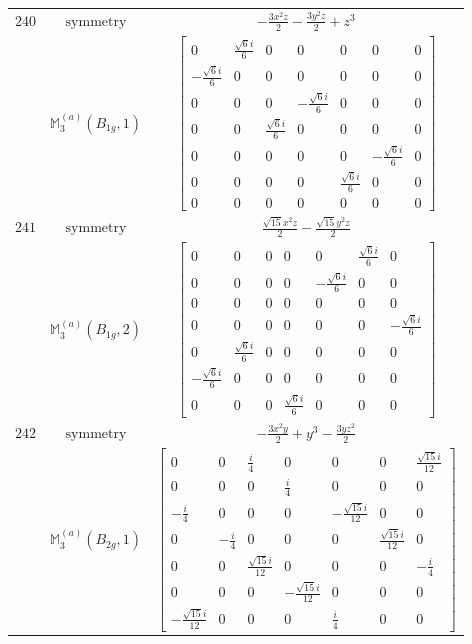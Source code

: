 \documentclass[fleqn,8pt,landscape]{jsarticle}
\begin{document}
\begin{longtable}{ccc}
$ 240 $ & $ \text{symmetry} $ & $ - \frac{3 x^{2} z}{2} - \frac{3 y^{2} z}{2} + z^{3} $ \\
$  $ & $ \mathbb{M}_{3}^{(a)}(B_{1g},1) $ & $ \begin{bmatrix} 0 & \frac{\sqrt{6} i}{6} & 0 & 0 & 0 & 0 & 0 \\ - \frac{\sqrt{6} i}{6} & 0 & 0 & 0 & 0 & 0 & 0 \\ 0 & 0 & 0 & - \frac{\sqrt{6} i}{6} & 0 & 0 & 0 \\ 0 & 0 & \frac{\sqrt{6} i}{6} & 0 & 0 & 0 & 0 \\ 0 & 0 & 0 & 0 & 0 & - \frac{\sqrt{6} i}{6} & 0 \\ 0 & 0 & 0 & 0 & \frac{\sqrt{6} i}{6} & 0 & 0 \\ 0 & 0 & 0 & 0 & 0 & 0 & 0 \end{bmatrix} $ \\ \hline
$ 241 $ & $ \text{symmetry} $ & $ \frac{\sqrt{15} x^{2} z}{2} - \frac{\sqrt{15} y^{2} z}{2} $ \\
$  $ & $ \mathbb{M}_{3}^{(a)}(B_{1g},2) $ & $ \begin{bmatrix} 0 & 0 & 0 & 0 & 0 & \frac{\sqrt{6} i}{6} & 0 \\ 0 & 0 & 0 & 0 & - \frac{\sqrt{6} i}{6} & 0 & 0 \\ 0 & 0 & 0 & 0 & 0 & 0 & 0 \\ 0 & 0 & 0 & 0 & 0 & 0 & - \frac{\sqrt{6} i}{6} \\ 0 & \frac{\sqrt{6} i}{6} & 0 & 0 & 0 & 0 & 0 \\ - \frac{\sqrt{6} i}{6} & 0 & 0 & 0 & 0 & 0 & 0 \\ 0 & 0 & 0 & \frac{\sqrt{6} i}{6} & 0 & 0 & 0 \end{bmatrix} $ \\ \hline
$ 242 $ & $ \text{symmetry} $ & $ - \frac{3 x^{2} y}{2} + y^{3} - \frac{3 y z^{2}}{2} $ \\
$  $ & $ \mathbb{M}_{3}^{(a)}(B_{2g},1) $ & $ \begin{bmatrix} 0 & 0 & \frac{i}{4} & 0 & 0 & 0 & \frac{\sqrt{15} i}{12} \\ 0 & 0 & 0 & \frac{i}{4} & 0 & 0 & 0 \\ - \frac{i}{4} & 0 & 0 & 0 & - \frac{\sqrt{15} i}{12} & 0 & 0 \\ 0 & - \frac{i}{4} & 0 & 0 & 0 & \frac{\sqrt{15} i}{12} & 0 \\ 0 & 0 & \frac{\sqrt{15} i}{12} & 0 & 0 & 0 & - \frac{i}{4} \\ 0 & 0 & 0 & - \frac{\sqrt{15} i}{12} & 0 & 0 & 0 \\ - \frac{\sqrt{15} i}{12} & 0 & 0 & 0 & \frac{i}{4} & 0 & 0 \end{bmatrix} $ \\ \hline

\end{longtable}
\end{document}
